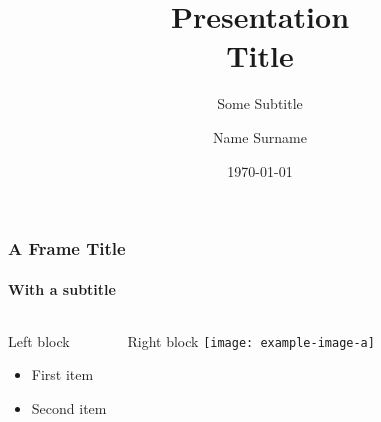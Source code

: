 \documentclass[10pt,t]{beamer}
\title{Presentation\\Title}
\subtitle{Some Subtitle}
\author[N. Surname]{Name Surname}
\institute[ShortConf]{Conference Name}
\date[\today]{\today}
\begin{document}
\maketitle

\begin{frame}
	\frametitle{A Frame Title}
	\framesubtitle{With a subtitle}
    \begin{columns}[onlytextwidth]
        \begin{block}{Left block}
        \begin{itemize}
            \item First item
            \item Second item
        \end{itemize}
        \end{block}
        \begin{block}{Right block}
            \texttt{[image: example-image-a]}
        \end{block}
    \end{columns}
\end{frame}
\end{document}
